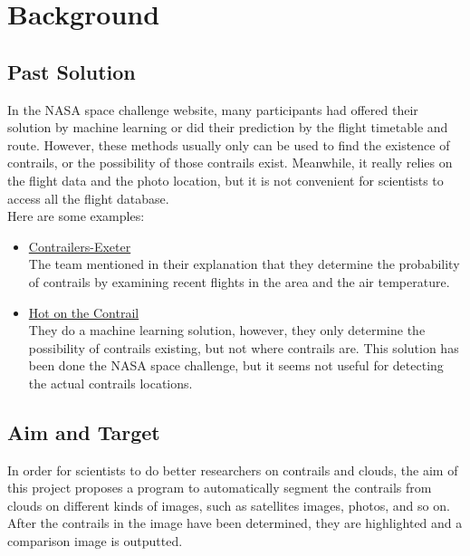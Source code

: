 \chapter{Background}


\section{Past Solution}

In the NASA space challenge website, many participants had offered their solution by machine learning or did their prediction by the flight timetable and route. However, these methods usually only can be used to find the existence of contrails, or the possibility of those contrails exist. Meanwhile, it really relies on the flight data and the photo location, but it is not convenient for scientists to access all the flight database.\\

Here are some examples:
\begin{itemize}
\item \href{https://2016.spaceappschallenge.org/challenges/aero/clouds-or-contrails/projects/contrailers-exeter}{Contrailers-Exeter} \\
The team mentioned in their explanation that they determine the probability of contrails by examining recent flights in the area and the air temperature. 
\item \href{https://2016.spaceappschallenge.org/challenges/aero/clouds-or-contrails/projects/hot-on-the-contrail}{Hot on the Contrail}\\
They do a machine learning solution, however, they only determine the possibility of contrails existing, but not where contrails are. This solution has been done the NASA space challenge, but it seems not useful for detecting the actual contrails locations.  
\end{itemize}

\section{Aim and Target}

In order for scientists to do better researchers on contrails and clouds, the aim of this project proposes a program to automatically segment the contrails from clouds on different kinds of images, such as satellites images, photos, and so on. After the contrails in the image have been determined, they are highlighted and a comparison image is outputted.

